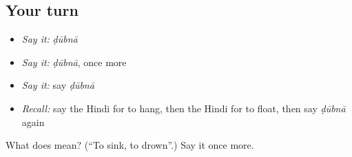 \subsection*{Your turn}
\begin{itemize}
\raggedright
  \item \emph{Say it:} \emph{ḍūbnā}
  \item \emph{Say it:} \emph{ḍūbnā}, once more
  \item \emph{Say it:} say \emph{ḍūbnā}
  \item \emph{Recall:} say the Hindi for to hang, then the Hindi for to float, then say \emph{ḍūbnā} again
\end{itemize}

\begin{tcolorbox}[breakable,colback=teal!4,colframe=teal!35!black,title={Before you move on}]
What does  mean? (\textquotedblleft{}To sink, to drown\textquotedblright{}.) Say it once more.
\end{tcolorbox}
